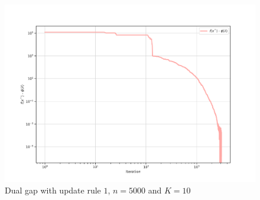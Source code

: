 \documentclass[notitlepage]{article}
\begin{document}
\begin{minipage}{.7\textwidth}
  \begin{figure}[H]
    \centering
    \includegraphics[scale=0.5]{pics/n=5000_K=10_gap_rule=1.png}
    \caption{Dual gap with update rule $1$, $n=5000$ and $K=10$}
    \label{fig:rule-1-n-5000-k-10-gap}
  \end{figure}
\end{minipage}
\begin{minipage}{.3\textwidth}
  \begin{table}[H]
    \centering
    \caption{\centering Sum up table for $n=5000$, $K=10$ and rule $1$}
    \label{tab:n-5000-K-10-rule-1}
  \end{table}
\end{minipage}
\end{document}
